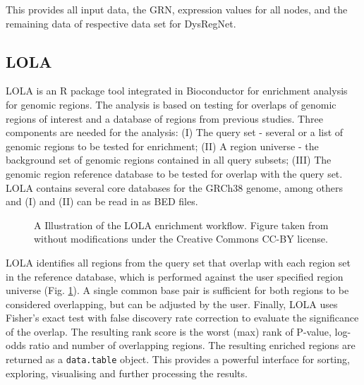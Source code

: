 \documentclass[pdftex,12pt,a4paper]{report}
\begin{document}
This provides all input data, the GRN, expression values for all nodes, and the remaining data of respective data set for DysRegNet.

\subsection{LOLA}
LOLA is an R package tool integrated in Bioconductor for enrichment analysis for genomic regions\cite{LOLA}. The analysis is based on testing for overlaps of genomic regions of interest and a database of regions from previous studies.
Three components are needed for the analysis: (I) The query set - several or a list of genomic regions to be tested for enrichment; (II) A region universe - the background set of genomic regions contained in all query subsets; (III) The genomic region reference database to be tested for overlap with the query set. LOLA contains several core databases for the GRCh38 genome, among others and (I) and (II) can be read in as BED files.
\begin{figure}[!ht]
\begin{center}
	\caption{A Illustration of the LOLA enrichment workflow. Figure taken from \cite{LOLA} without modifications under the Creative Commons CC-BY license.}
	\label{lola}
\end{center}
\end{figure}
LOLA identifies all regions from the query set that overlap with each region set in the reference database, which is performed against the user specified region universe (Fig. \ref{lola}). A single common base pair is sufficient for both regions to be considered overlapping, but can be adjusted by the user. Finally, LOLA uses Fisher's exact test with false discovery rate correction to evaluate the significance of the overlap. The resulting rank score is the worst (max) rank of P-value, log-odds ratio and number of overlapping regions. The resulting enriched regions are returned as a \texttt{data.table} object. This provides a powerful interface for sorting, exploring, visualising and further processing the results.
\end{document}
